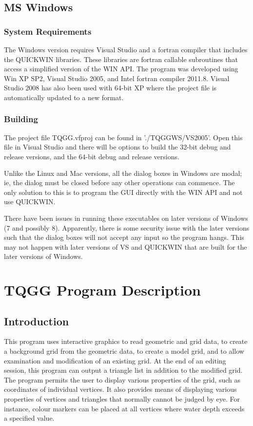 \documentclass{article}
\begin{document}
\subsection{MS Windows}
\subsubsection{System Requirements}
The Windows version requires Visual Studio and a fortran compiler that includes the QUICKWIN
libraries. These libraries are fortran callable subroutines that access a simplified version
of the WIN API. The program was developed using Win XP SP2, Visual Studio 2005, and Intel fortran
compiler 2011.8. Visual Studio 2008 has also been used with 64-bit XP where the project file is
automatically updated to a new format.

\subsubsection{Building}
The project file TQGG.vfproj can be found in './TQGGWS/VS2005'. Open this file in Visual Studio
and there will be options to build the 32-bit debug and release versions, and the 64-bit debug 
and release versions.

Unlike the Linux and Mac versions, all the dialog boxes in Windows are modal; ie, the dialog must be 
closed before any other operations can commence. The only solution to this is to program the GUI
directly with the WIN API and not use QUICKWIN.

There have been issues in running these executables on later versions of Windows (7 and possibly 8).
Apparently, there is some security issue with the later versions such that the dialog boxes will
not accept any input so the program hangs. This may not happen with later versions of VS and QUICKWIN that
are built for the later versions of Windows.




\newpage
\section{TQGG Program Description}

\label{bkm:Ref406485171}\label{bkm:Ref406484745}\subsection{Introduction}
This program uses interactive graphics to read geometric and grid data, to create a background grid from the geometric data, to create a model grid, and to allow examination and modification of an existing grid. At the end of an editing session, this program can output a triangle list in addition to the modified grid. The program permits the user to display various properties of the grid, such as coordinates of individual vertices. It also provides means of displaying various properties of vertices and triangles that normally cannot be judged by eye. For instance, colour markers can be placed at all vertices where water depth exceeds a specified value.
\end{document}
